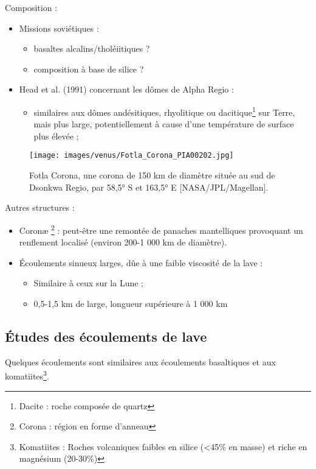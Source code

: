 \documentclass[10pt,a4paper, twocolumns]{article}
\begin{document}
	Composition :
	\begin{itemize}
		\item Missions soviétiques :
		\begin{itemize}
			\item basaltes alcalins/tholéiitiques ?
			\item composition à base de silice ?
		\end{itemize}
		\item Head et al. (1991) concernant les dômes de  Alpha Regio :
		\begin{itemize}
			\item similaires aux dômes andésitiques, rhyolitique ou dacitique\footnote{Dacite : roche composée de quartz} sur Terre, mais plus large, potentiellement à cause d'une température de surface plus élevée ;
		\end{itemize}
	\end{itemize}
	
	\begin{figure}[!h]
		\centering
		\texttt{[image: images/venus/Fotla\_Corona\_PIA00202.jpg]} 
		\caption{Fotla Corona, une corona de 150 km de diamètre située au sud de Dsonkwa Regio, par 58,5° S et 163,5° E [NASA/JPL/Magellan].}
	\end{figure}
	Autres structures :
	\begin{itemize}
		\item Coronæ \footnote{Corona : région en forme d'anneau} : peut-être une remontée de panaches mantelliques provoquant un renflement localisé (environ 200-1 000 km de diamètre).
		\item Écoulements sinueux larges, dûe à une faible viscosité de la lave :
		\begin{itemize}
			\item Similaire à ceux sur la Lune ;
			\item 0,5-1,5 km de large, longueur supérieure à 1 000 km
		\end{itemize}
	\end{itemize}
	
\subsection{Études des écoulements de lave}

	Quelques écoulements sont similaires aux écoulements basaltiques et aux komatiites\footnote{Komatiites : Roches volcaniques faibles en silice (<45\% en masse) et riche en magnésium (20-30\%)}.
	
\end{document}
